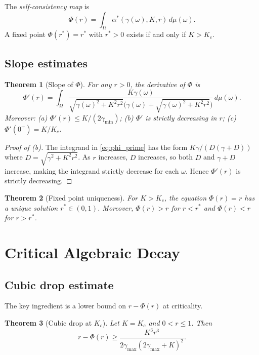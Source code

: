 \documentclass[12pt]{article}
\newtheorem{theorem}{Theorem}[section]
\theoremstyle{definition}
\begin{document}
The \emph{self-consistency map} is
\begin{equation}\label{eq:sc_map}
\Phi(r) = \int_\Omega \alpha^*(\gamma(\omega), K, r)\,d\mu(\omega).
\end{equation}
A fixed point $\Phi(r^*) = r^*$ with $r^* > 0$ exists if and only if $K > K_c$.

\subsection{Slope estimates}

\begin{theorem}[Slope of $\Phi$]\label{thm:slope}
For any $r > 0$, the derivative of $\Phi$ is
\begin{equation}\label{eq:phi_prime}
\Phi'(r) = \int_\Omega \frac{K\gamma(\omega)}{\sqrt{\gamma(\omega)^2 + K^2 r^2}\bigl(\gamma(\omega) + \sqrt{\gamma(\omega)^2 + K^2 r^2}\bigr)}\,d\mu(\omega).
\end{equation}
Moreover: (a) $\Phi'(r) \le K/(2\gamma_{\min})$; (b) $\Phi'$ is strictly
decreasing in $r$; (c) $\Phi'(0^+) = K/K_c$.
\end{theorem}

\begin{proof}[Proof of (b)]
The integrand in \eqref{eq:phi_prime} has the form $K\gamma/(D(\gamma+D))$ where
$D = \sqrt{\gamma^2 + K^2r^2}$.  As $r$ increases, $D$ increases, so both $D$
and $\gamma + D$ increase, making the integrand strictly decrease for each $\omega$.
Hence $\Phi'(r)$ is strictly decreasing.
\end{proof}

\begin{theorem}[Fixed point uniqueness]\label{thm:uniqueness}
For $K > K_c$, the equation $\Phi(r) = r$ has a unique solution
$r^* \in (0,1)$.  Moreover, $\Phi(r) > r$ for $r < r^*$ and
$\Phi(r) < r$ for $r > r^*$.
\end{theorem}


\section{Critical Algebraic Decay}

\subsection{Cubic drop estimate}

The key ingredient is a lower bound on $r - \Phi(r)$ at criticality.

\begin{theorem}[Cubic drop at $K_c$]\label{thm:cubic_drop}
Let $K = K_c$ and $0 < r \le 1$.  Then
\begin{equation}\label{eq:cubic_drop}
r - \Phi(r) \ge \frac{K^3 r^3}{2\gamma_{\max}(2\gamma_{\max} + K)^2}.
\end{equation}
\end{theorem}
\end{document}
